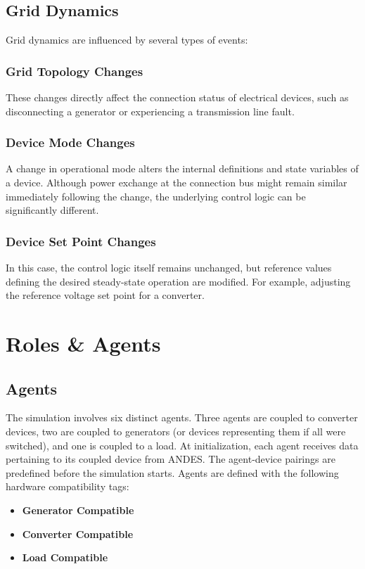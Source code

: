 \documentclass{article}
\begin{document}
\subsection{Grid Dynamics}
Grid dynamics are influenced by several types of events:

\subsubsection*{Grid Topology Changes}
These changes directly affect the connection status of electrical devices, such as disconnecting a generator or experiencing a transmission line fault.

\subsubsection*{Device Mode Changes}
A change in operational mode alters the internal definitions and state variables of a device. Although power exchange at the connection bus might remain similar immediately following the change, the underlying control logic can be significantly different.

\subsubsection*{Device Set Point Changes}
In this case, the control logic itself remains unchanged, but reference values defining the desired steady-state operation are modified. For example, adjusting the reference voltage set point for a converter.

\section{Roles \& Agents}

\subsection{Agents}
The simulation involves six distinct agents. Three agents are coupled to converter devices, two are coupled to generators (or devices representing them if all were switched), and one is coupled to a load. At initialization, each agent receives data pertaining to its coupled device from ANDES. The agent-device pairings are predefined before the simulation starts. Agents are defined with the following hardware compatibility tags:

\begin{itemize}
    \item \textbf{Generator Compatible}
    \item \textbf{Converter Compatible}
    \item \textbf{Load Compatible}
\end{itemize}
\end{document}
